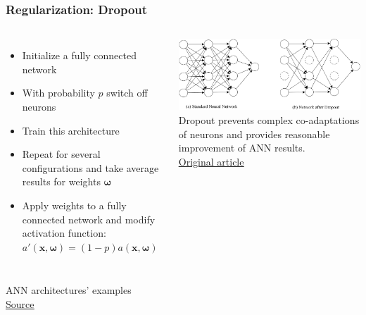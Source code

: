 \documentclass[12pt, aspectratio = 169]{beamer}
\newcommand{\green}{\color{calmGreen}}
\newcommand{\black}{\color{black}}
\begin{document}
\begin{frame}[t]
	\frametitle{Regularization: Dropout}
	\vspace{0.5em}
	\begin{columns}
		\begin{minipage}[T]{\linewidth}
			\begin{itemize}
				\item Initialize a fully connected network
				\item With probability $p$ switch off neurons
				\item Train this architecture
				\item Repeat for several configurations and take average results for weights $\bm \omega$
				\item Apply weights to a fully connected network and modify activation function: $a'(\bm x, \bm \omega) = (1-p) a(\bm x, \bm \omega)$
			\end{itemize}%
		\end{minipage}%
		\begin{minipage}[T]{\linewidth}
			\includegraphics[width=1\linewidth]{dropout}\\
			\flushleft
			\green Dropout \black prevents complex co-adaptations of neurons and provides reasonable improvement of ANN results.\\
			\href{https://arxiv.org/pdf/1207.0580.pdf}{\color{blue}\uline{Original article}}
		\end{minipage}
	\end{columns}
\end{frame}


\begin{frame}
	\centering
	\large ANN architectures' examples\\
	\href{https://www.asimovinstitute.org/neural-network-zoo/}{\color{blue}\uline{Source}}
\end{frame}
\end{document}
